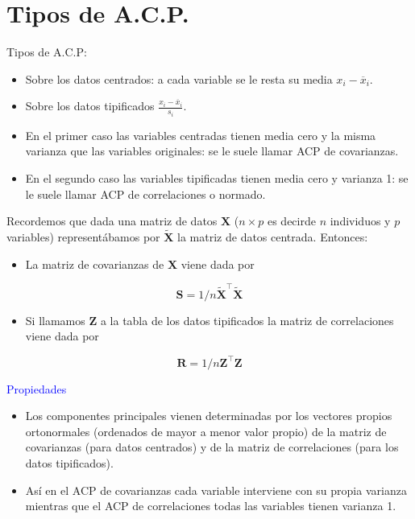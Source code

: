 \documentclass[
  spanish,
  ignorenonframetext,
]{beamer}
\providecommand{\tightlist}{%
  \setlength{\itemsep}{0pt}\setlength{\parskip}{0pt}}
\newcommand\blue[1]{\textcolor{blue}{#1}}
\begin{document}
\hypertarget{tipos-de-a.c.p.}{%
\section{Tipos de A.C.P.}\label{tipos-de-a.c.p.}}

\begin{frame}{Tipos de A.C.P:}
\protect\hypertarget{tipos-de-a.c.p}{}
\begin{itemize}
\tightlist
\item
  Sobre los datos centrados: a cada variable se le resta su media
  \(x_i-\overline{x}_i\).
\item
  Sobre los datos tipificados \(\frac{x_{i}-\overline{x}_i}{s_i}\).
\item
  En el primer caso las variables centradas tienen media cero y la misma
  varianza que las variables originales: se le suele llamar ACP de
  covarianzas.
\item
  En el segundo caso las variables tipificadas tienen media cero y
  varianza 1: se le suele llamar ACP de correlaciones o normado.
\end{itemize}

Recordemos que dada una matriz de datos \(\mathbf{X}\) (\(n\times p\) es
decirde \(n\) individuos y \(p\) variables) representábamos por
\(\tilde{\mathbf{X}}\) la matriz de datos centrada. Entonces:

\begin{itemize}
\tightlist
\item
  La matriz de covarianzas de \(\mathbf{X}\) viene dada por
\end{itemize}

\[\mathbf{S}=1/n \tilde{\mathbf{X}}^\top \tilde{\mathbf{X}}\]

\begin{itemize}
\tightlist
\item
  Si llamamos \(\mathbf{Z}\) a la tabla de los datos tipificados la
  matriz de correlaciones viene dada por
\end{itemize}

\[\mathbf{R}=1/n \mathbf{Z}^\top \mathbf{Z}\]

\blue{Propiedades}

\begin{itemize}
\tightlist
\item
  Los componentes principales vienen determinadas por los vectores
  propios ortonormales (ordenados de mayor a menor valor propio) de la
  matriz de covarianzas (para datos centrados) y de la matriz de
  correlaciones (para los datos tipificados).
\item
  Así en el ACP de covarianzas cada variable interviene con su propia
  varianza mientras que el ACP de correlaciones todas las variables
  tienen varianza 1.
\end{itemize}
\end{frame}
\end{document}
